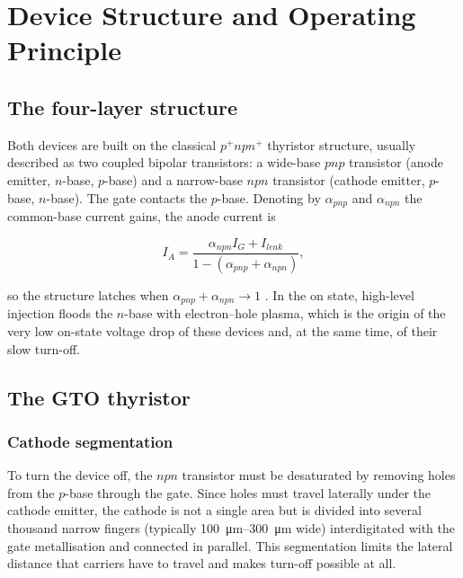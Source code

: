 \documentclass[11pt,a4paper]{report}
\begin{document}
\chapter{Device Structure and Operating Principle}
\label{ch:devices}

\section{The four-layer structure}

Both devices are built on the classical $p^{+}npn^{+}$ thyristor structure,
usually described as two coupled bipolar transistors: a wide-base $pnp$
transistor (anode emitter, $n$-base, $p$-base) and a narrow-base $npn$
transistor (cathode emitter, $p$-base, $n$-base). The gate contacts the $p$-base.
Denoting by $\alpha_{pnp}$ and $\alpha_{npn}$ the common-base current gains, the
anode current is

\begin{equation}
I_{A} = \frac{\alpha_{npn} I_{G} + I_{leak}}{1 - (\alpha_{pnp} + \alpha_{npn})},
\end{equation}

so the structure latches when $\alpha_{pnp} + \alpha_{npn} \rightarrow 1$
\cite{baliga2008,lutz2011}. In the on state, high-level injection floods the
$n$-base with electron--hole plasma, which is the origin of the very low on-state
voltage drop of these devices and, at the same time, of their slow turn-off.

\section{The GTO thyristor}

\subsection{Cathode segmentation}

To turn the device off, the $npn$ transistor must be desaturated by removing
holes from the $p$-base through the gate. Since holes must travel laterally
under the cathode emitter, the cathode is not a single area but is divided into
several thousand narrow fingers (typically \SIrange{100}{300}{\micro\metre}
wide) interdigitated with the gate metallisation and connected in parallel. This
segmentation limits the lateral distance that carriers have to travel and makes
turn-off possible at all.
\end{document}
